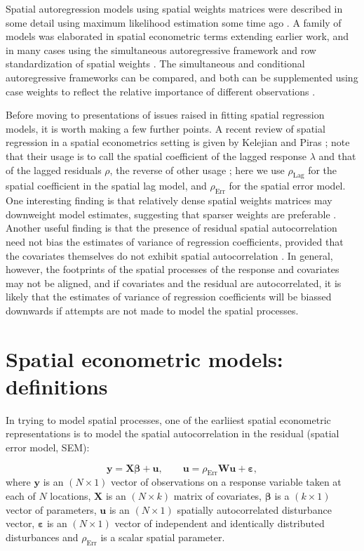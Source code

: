\documentclass[]{book}
\begin{document}
Spatial autoregression models using spatial weights matrices were described in some detail using maximum likelihood estimation some time ago \citep{cliff+ord:73, cliff+ord:81}. A family of models was elaborated in spatial econometric terms extending earlier work, and in many cases using the simultaneous autoregressive framework and row standardization of spatial weights \citep{a88}. The simultaneous and conditional autoregressive frameworks can be compared, and both can be supplemented using case weights to reflect the relative importance of different observations \citep{WallerGotway:2004}.

Before moving to presentations of issues raised in fitting spatial regression models, it is worth making a few further points. A recent review of spatial regression in a spatial econometrics setting is given by Kelejian and Piras \citeyearpar{kelejian+piras:17}; note that their usage is to call the spatial coefficient of the lagged response \(\lambda\) and that of the lagged residuals \(\rho\), the reverse of other usage \citep{a88, lesage+pace:09}; here we use \(\rho_{\mathrm{Lag}}\) for the spatial coefficient in the spatial lag model, and \(\rho_{\mathrm{Err}}\) for the spatial error model. One interesting finding is that relatively dense spatial weights matrices may downweight model estimates, suggesting that sparser weights are preferable \citep{smith:09}. Another useful finding is that the presence of residual spatial autocorrelation need not bias the estimates of variance of regression coefficients, provided that the covariates themselves do not exhibit spatial autocorrelation \citep{smith+lee12}. In general, however, the footprints of the spatial processes of the response and covariates may not be aligned, and if covariates and the residual are autocorrelated, it is likely that the estimates of variance of regression coefficients will be biassed downwards if attempts are not made to model the spatial processes.

\hypertarget{spatial-econometric-models-definitions}{%
\section{Spatial econometric models: definitions}\label{spatial-econometric-models-definitions}}

In trying to model spatial processes, one of the earliiest spatial econometric representations is to model the spatial autocorrelation in the residual (spatial error model, SEM):

\[
{\mathbf y} = {\mathbf X}{\mathbf \beta} + {\mathbf u},
\qquad {\mathbf u} = \rho_{\mathrm{Err}} {\mathbf W} {\mathbf u} + {\mathbf \varepsilon},
\]
where \({\mathbf y}\) is an \((N \times 1)\) vector of observations on a response variable taken at each of \(N\) locations, \({\mathbf X}\) is an \((N \times k)\) matrix of covariates, \({\mathbf \beta}\) is a \((k \times 1)\) vector of parameters, \({\mathbf u}\) is an \((N \times 1)\) spatially autocorrelated disturbance vector, \({\mathbf \varepsilon}\) is an \((N \times 1)\) vector of independent and identically distributed disturbances and \(\rho_{\mathrm{Err}}\) is a scalar spatial parameter.
\end{document}

